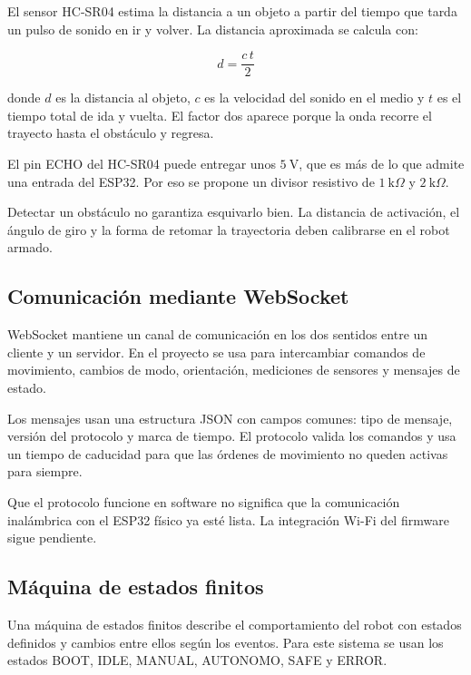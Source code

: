 \documentclass[journal]{IEEEtran}
\begin{document}
El sensor HC-SR04 estima la distancia a un objeto a partir del tiempo que tarda un pulso de sonido en ir y volver. La distancia aproximada se calcula con:

\begin{equation}
d=\frac{c\,t}{2}
\label{eq:distancia_ultrasonica}
\end{equation}

donde $d$ es la distancia al objeto, $c$ es la velocidad del sonido en el medio y $t$ es el tiempo total de ida y vuelta. El factor dos aparece porque la onda recorre el trayecto hasta el obstáculo y regresa.

El pin ECHO del HC-SR04 puede entregar unos $5~\mathrm{V}$, que es más de lo que admite una entrada del ESP32. Por eso se propone un divisor resistivo de $1~\mathrm{k}\Omega$ y $2~\mathrm{k}\Omega$.

Detectar un obstáculo no garantiza esquivarlo bien. La distancia de activación, el ángulo de giro y la forma de retomar la trayectoria deben calibrarse en el robot armado.

\subsection{Comunicación mediante WebSocket}

WebSocket mantiene un canal de comunicación en los dos sentidos entre un cliente y un servidor. En el proyecto se usa para intercambiar comandos de movimiento, cambios de modo, orientación, mediciones de sensores y mensajes de estado.

Los mensajes usan una estructura JSON con campos comunes: tipo de mensaje, versión del protocolo y marca de tiempo. El protocolo valida los comandos y usa un tiempo de caducidad para que las órdenes de movimiento no queden activas para siempre.

Que el protocolo funcione en software no significa que la comunicación inalámbrica con el ESP32 físico ya esté lista. La integración Wi-Fi del firmware sigue pendiente.

\subsection{Máquina de estados finitos}

Una máquina de estados finitos describe el comportamiento del robot con estados definidos y cambios entre ellos según los eventos. Para este sistema se usan los estados BOOT, IDLE, MANUAL, AUTONOMO, SAFE y ERROR.
\end{document}
